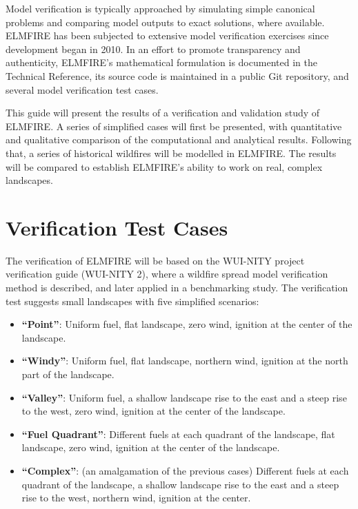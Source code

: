 Model verification is typically approached by simulating simple canonical problems and comparing model outputs to exact solutions, where available. ELMFIRE has been subjected to extensive model verification exercises since development began in 2010. In an effort to promote transparency and authenticity, ELMFIRE’s mathematical formulation is documented in the Technical Reference, its source code is maintained in a public Git repository, and several model verification test cases.

This guide will present the results of a verification and validation study of ELMFIRE. A series of simplified cases will first be presented, with quantitative and qualitative comparison of the computational and analytical results. Following that, a series of historical wildfires will be modelled in ELMFIRE. The results will be compared to establish ELMFIRE's ability to work on real, complex landscapes. 

\section{Verification Test Cases}

The verification of ELMFIRE will be based on the WUI-NITY project verification guide (WUI-NITY 2), where a wildfire spread model verification method is described, and later applied in a benchmarking study. The verification test suggests small landscapes with five simplified scenarios:
\begin{itemize}
 \item \textbf{``Point''}: Uniform fuel, flat landscape, zero wind, ignition at the center of the landscape.
 \item \textbf{``Windy''}: Uniform fuel, flat landscape, northern wind, ignition at the north part of the landscape.
 \item \textbf{``Valley''}: Uniform fuel, a shallow landscape rise to the east and a steep rise to the west, zero wind, ignition at the center of the landscape.
 \item \textbf{``Fuel Quadrant''}: Different fuels at each quadrant of the landscape, flat landscape, zero wind, ignition at the center of the landscape.
 \item \textbf{``Complex''}: (an amalgamation of the previous cases) Different fuels at each quadrant of the landscape, a shallow landscape rise to the east and a steep rise to the west, northern wind, ignition at the center. 
\end{itemize}

